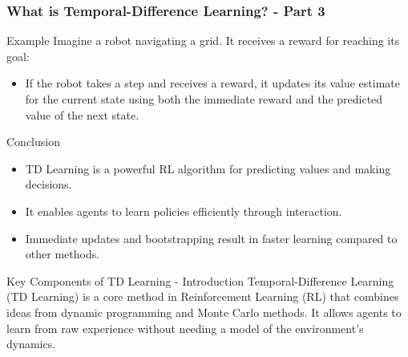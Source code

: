 \documentclass[aspectratio=169]{beamer}
\begin{document}
\begin{frame}[fragile]
    \frametitle{What is Temporal-Difference Learning? - Part 3}
    \begin{exampleblock}{Example}
        Imagine a robot navigating a grid. It receives a reward for reaching its goal:
        \begin{itemize}
            \item If the robot takes a step and receives a reward, it updates its value estimate for the current state using both the immediate reward and the predicted value of the next state.
        \end{itemize}
    \end{exampleblock}

    \begin{block}{Conclusion}
        \begin{itemize}
            \item TD Learning is a powerful RL algorithm for predicting values and making decisions.
            \item It enables agents to learn policies efficiently through interaction.
            \item Immediate updates and bootstrapping result in faster learning compared to other methods.
        \end{itemize}
    \end{block}
\end{frame}

\begin{frame}[fragile]{Key Components of TD Learning - Introduction}
    Temporal-Difference Learning (TD Learning) is a core method in Reinforcement Learning (RL) that combines ideas from dynamic programming and Monte Carlo methods. It allows agents to learn from raw experience without needing a model of the environment's dynamics.
\end{frame}
\end{document}
